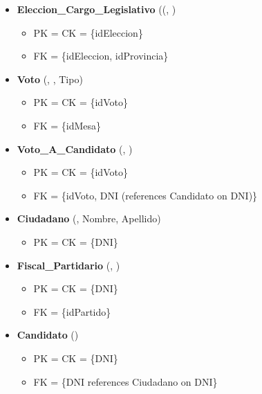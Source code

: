 \begin{itemize}
	\item \textbf{Eleccion\_Cargo\_Legislativo} ((, ) 
	\begin{itemize}
		\item PK = CK = \{idEleccion\}
		\item FK = \{idEleccion, idProvincia\}
	\end{itemize}
	\vspace{1mm}
	 

	\item \textbf{Voto} (, , Tipo) 
	\begin{itemize}
		\item PK = CK = \{idVoto\}
		\item FK = \{idMesa\}
	\end{itemize}
	\vspace{1mm}

	\item \textbf{Voto\_A\_Candidato} (, ) 
	\begin{itemize}
		\item PK = CK = \{idVoto\}
		\item FK = \{idVoto, DNI (references Candidato on DNI)\}
	\end{itemize}
	\vspace{1mm}

	\item \textbf{Ciudadano} (, Nombre, Apellido)
	\begin{itemize}
		\item PK = CK = \{DNI\}
	\end{itemize}
	\vspace{1mm}


	\item \textbf{Fiscal\_Partidario} (, ) 
	\begin{itemize}
		\item PK = CK = \{DNI\}
		\item FK = \{idPartido\}
	\end{itemize}
	\vspace{1mm}

	\item \textbf{Candidato} () 
	\begin{itemize}
		\item PK = CK = \{DNI\}
		\item FK = \{DNI references Ciudadano on DNI\}
	\end{itemize}
	\vspace{1mm}



\end{itemize}
